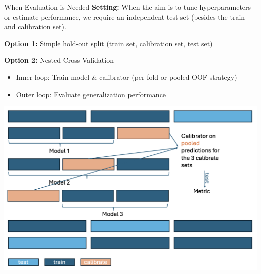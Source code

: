 \documentclass[11pt,compress,t,notes=noshow, xcolor=table]{beamer}
\begin{document}
\begin{frame}{When Evaluation is Needed}
\textbf{Setting:} When the aim is to tune hyperparameters or estimate performance, we require an independent test set (besides the train and calibration set).

\vspace{0.5em}
\textbf{Option 1:} Simple hold-out split (train set, calibration set, test set)

\vspace{0.5em}
\textbf{Option 2:} Nested Cross-Validation
\begin{itemize}
  \item Inner loop: Train model \& calibrator (per-fold or pooled OOF strategy) 
  \item Outer loop: Evaluate generalization performance
\end{itemize}

\centering
\includegraphics[width=0.6\linewidth]{figure_man/CalibrationCVPooled.png}
\end{frame}






\end{document}
